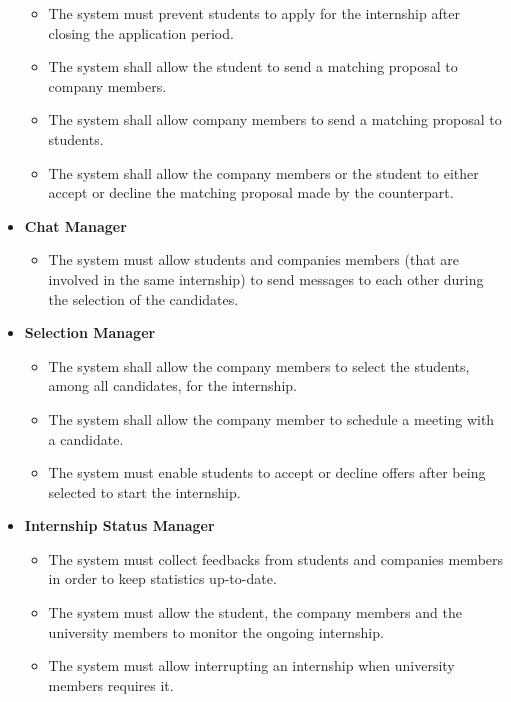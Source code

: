 \begin{itemize}
    \begin{itemize}
        \item [\text{ [R22] }] The system must prevent students to apply for the internship after closing the application period.
        \item [\text{ [R28] }] The system shall allow the student to send a matching proposal to company members.
        \item [\text{ [R29] }] The system shall allow company members to send a matching proposal to students.
        \item [\text{ [R32] }] The system shall allow the company members or the student to either accept or decline the matching proposal made by the counterpart.\\
    \end{itemize}
    \item \textbf{Chat Manager}
    \begin{itemize}
        \item [\text{ [R25] }] The system must allow students and companies members (that are involved in the same internship) to send messages to each other during the selection of the candidates.\\
    \end{itemize}
    \item \textbf{Selection Manager}
    \begin{itemize}
        \item [\text{ [R14] }] The system shall allow the company members to select the students, among all candidates, for the internship.
        \item [\text{ [R17] }] The system shall allow the company member to schedule a meeting with a candidate.
        \item [\text{ [R34] }] The system must enable students to accept or decline offers after being selected to start the internship.\\
    \end{itemize}
    \item \textbf{Internship Status Manager}
    \begin{itemize}
        \item [\text{ [R15] }] The system must collect feedbacks from students and companies members in order to keep statistics up-to-date.
        \item [\text{ [R18] }] The system must allow the student, the company members and the university members to monitor the ongoing internship.
        \item [\text{ [R19] }] The system must allow interrupting an internship when university members requires it.

\end{itemize}
\end{itemize}
